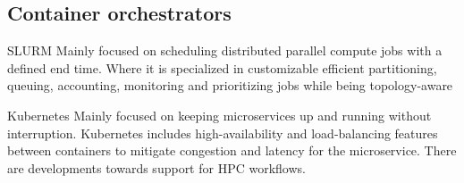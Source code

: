 \documentclass[hyperref={pdfpagelabels=false},aspectratio=169]{beamer}
\begin{document}
    \subsection{Container orchestrators}
    \begin{frame}
      \begin{block}{SLURM}
Mainly focused on scheduling distributed parallel compute jobs with a defined end time. Where it is specialized in customizable efficient partitioning, queuing, accounting, monitoring and prioritizing jobs while being topology-aware
      \end{block}
      \begin{block}{Kubernetes}
Mainly focused on keeping microservices up and running without interruption. Kubernetes includes high-availability and load-balancing features between containers to mitigate congestion and latency for the microservice. There are developments towards support for HPC workflows.
      \end{block}
    \end{frame}
    
\end{document}
